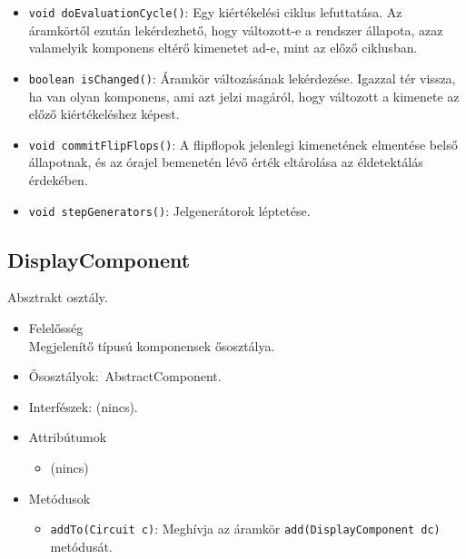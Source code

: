 \begin{itemize}
\begin{itemize}
	\item \texttt{void doEvaluationCycle()}: Egy kiértékelési ciklus lefuttatása. Az áramkörtől ezután lekérdezhető, hogy változott-e a rendszer állapota, azaz valamelyik komponens eltérő kimenetet ad-e, mint az előző ciklusban.
	\item \texttt{boolean isChanged()}: Áramkör változásának lekérdezése. Igazzal tér vissza, ha van olyan komponens, ami azt jelzi magáról, hogy változott a kimenete az előző kiértékeléshez képest.
	\item \texttt{void commitFlipFlops()}: A flipflopok jelenlegi kimenetének elmentése belső állapotnak, és az órajel bemenetén lévő érték eltárolása az éldetektálás érdekében.
	\item \texttt{void stepGenerators()}: Jelgenerátorok léptetése.
\end{itemize}
\end{itemize}

\subsection{DisplayComponent}
Absztrakt osztály.
\begin{itemize}
\item Felelősség\\
Megjelenítő típusú komponensek ősosztálya.
\item Ősosztályok:\ AbstractComponent.
\item Interfészek: (nincs).
\item Attribútumok $\ $
\begin{itemize}
	\item (nincs)
\end{itemize}
\item Metódusok$\ $
\begin{itemize}
\item \texttt{addTo(Circuit c)}: Meghívja az áramkör \texttt{add(DisplayComponent dc)} metódusát.
\end{itemize}
\end{itemize}

